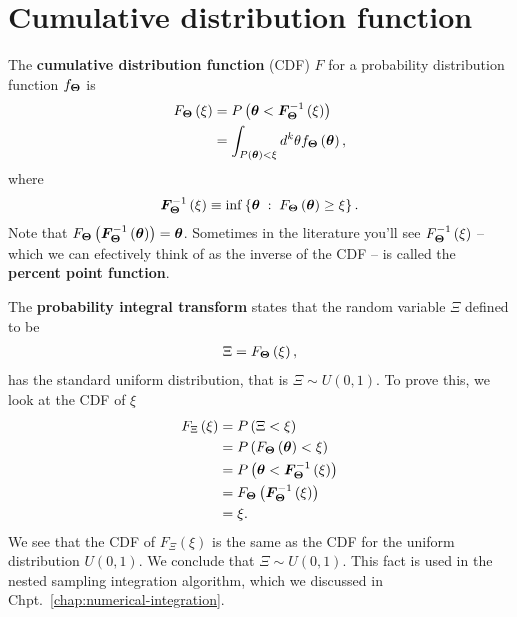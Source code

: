 \section{Cumulative distribution function}

The \textbf{cumulative distribution function} (CDF) $F$ for a probability distribution function $f_{{\bm \Theta}}$ is
\begin{align}
    F_{{\bm \Theta}}\left(\xi\right)
    &=
    P\left({\bm \theta} < {\bm F}^{-1}_{{\bm \Theta}}\left(\xi\right)\right)
    \nonumber\\
    &=
    \int_{P\left({\bm \theta}\right)<\xi} d^k\theta f_{{\bm \Theta}}\left({\bm \theta}\right)
    ,
\end{align}
where
\begin{align}
    {\bm F}^{-1}_{{\bm \Theta}}\left(\xi\right)
    \equiv
    \inf\left\{{\bm \theta} \; : \; F_{{\bm \Theta}}\left({\bm \theta}\right) \geq \xi\right\}
    .
\end{align}
Note that $F_{{\bm \Theta}}\left({\bm F}^{-1}_{{\bm \Theta}}\left({\bm \theta}\right)\right) = {\bm \theta}$.
Sometimes in the literature you'll see $F^{-1}_{{\bm \Theta}}\left(\xi\right)$ -- which we can efectively think of as the inverse of the CDF -- is called the \textbf{percent point function}.

The \textbf{probability integral transform} states that the random variable $\Xi$ defined to be
\begin{align}
    \Xi = F_{{\bm \Theta}}\left(\xi\right)
    ,
\end{align}
has the standard uniform distribution, that is $\Xi\sim U\left(0,1\right)$.
To prove this, we look at the CDF of $\xi$
\begin{align}
    F_{\Xi}\left(\xi\right)
    &=
    P\left(\Xi < \xi\right)
    \nonumber\\
    &=
    P\left(F_{{\bm \Theta}}\left({\bm \theta}\right) < \xi\right)
    \nonumber\\
    &=
    P\left({\bm \theta} < {\bm F}^{-1}_{{\bm \Theta}}\left(\xi\right)\right)
    \nonumber\\
    &=
    F_{{\bm \Theta}}\left({\bm F}^{-1}_{{\bm \Theta}}\left(\xi\right)\right)
    \nonumber\\
    &=
    \xi
    .
\end{align}
We see that the CDF of $F_{\Xi}\left(\xi\right)$ is the same
as the CDF for the uniform distribution $U\left(0,1\right)$.
We conclude that $\Xi\sim U\left(0,1\right)$.
This fact is used in the nested sampling integration algorithm,
which we discussed in Chpt.~\ref{chap:numerical-integration}.

